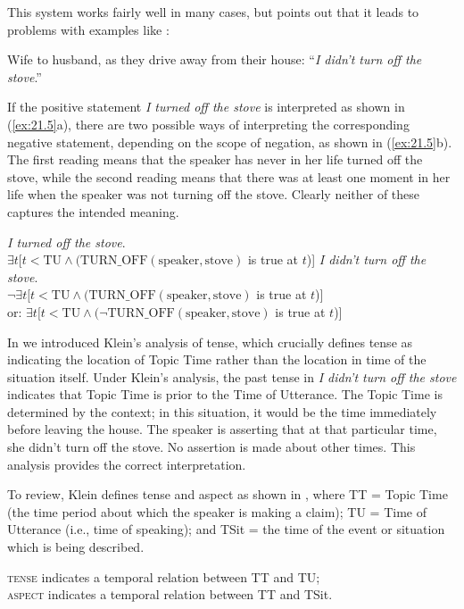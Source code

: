 This system works fairly well in many cases, but \citet{Partee1973} points out that it leads to problems with examples like :


\ea \label{ex:21.4}
Wife to husband, as they drive away from their house: “\textit{I didn’t turn off the stove}.”
\z


If the positive statement \textit{I turned off the stove} is interpreted as shown in (\ref{ex:21.5}a), there are two possible ways of interpreting the corresponding negative statement, depending on the scope of negation, as shown in (\ref{ex:21.5}b). The first reading means that the speaker has never in her life turned off the stove, while the second reading means that there was at least one moment in her life when the speaker was not turning off the stove. Clearly neither of these captures the intended meaning.


\ea \label{ex:21.5}
\ea   \textit{I turned off the stove}. \\ 
$\exists t [t < \text{TU} \wedge (\text{TURN\_OFF}(\text{speaker}, \text{stove})$ is true at $t$)]
\ex   \textit{I didn’t turn off the stove}. \\
$\neg\exists t [t < \text{TU} \wedge (\text{TURN\_OFF}(\text{speaker}, \text{stove})$ is true at $t$)]\\
  or:  $\exists t [t < \text{TU} \wedge (\neg\text{TURN\_OFF}(\text{speaker}, \text{stove})$ is true at $t$)]
\z \z

In  we introduced Klein’s analysis of tense, which crucially defines tense as indicating the location of Topic Time rather than the location in time of the situation itself. Under Klein’s analysis, the past tense in  \textit{I didn’t turn off the stove} indicates that Topic Time is prior to the Time of Utterance. The Topic Time is determined by the context; in this situation, it would be the time immediately before leaving the house. The speaker is asserting that at that particular time, she didn’t turn off the stove. No assertion is made about other times. This analysis provides the correct interpretation.


To review, Klein defines tense and aspect as shown in , where TT = Topic Time (the time period about which the speaker is making a claim); TU = Time of Utterance (i.e., time of speaking); and TSit = the time of the event or situation which is being described.


\ea \label{ex:21.6}
\ea  \textsc{tense} indicates a temporal relation between TT and TU;\\
\ex \textsc{aspect} indicates a temporal relation between TT and TSit.
                       \z
\z


